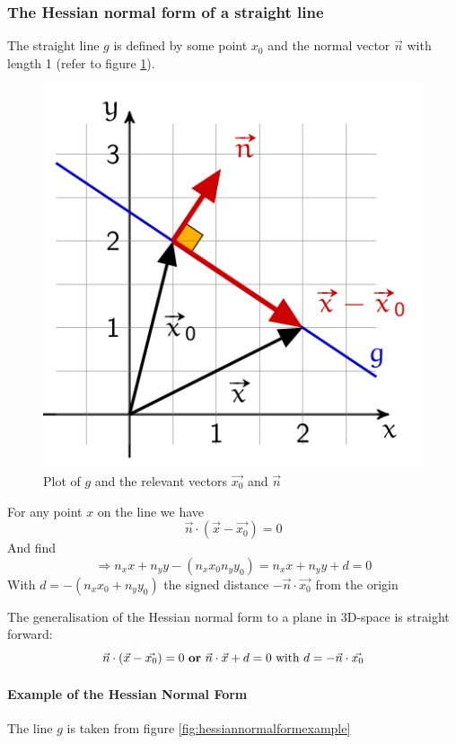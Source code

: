\documentclass[a4paper, 11pt]{article}
\begin{document}
\subsubsection{The Hessian normal form of a straight line}

The straight line $g$ is defined by some point $x_0$ and the normal vector $\vec{n}$ with length 1 (refer to figure \ref{fig:hessiannormalform}).

\begin{figure}[htb!]
	\centering
	\includegraphics[keepaspectratio, width=0.4\linewidth]{Pictures/Hessian_normal_form}
	\caption{Plot of $g$ and the relevant vectors $\vec{x_0}$ and $\vec{n}$}
	\label{fig:hessiannormalform}
\end{figure}
\noindent
For any point $x$ on the line we have
\begin{equation*}
\vec{n}\cdot(\vec{x}-\vec{x_0})=0
\end{equation*}
\noindent
And find
\begin{equation*}
\Rightarrow n_x x + n_y y -(n_x x_0  n_y y_0) = n_x x +n_y y + d = 0
\end{equation*}
\noindent
With $d=-(n_x x_0 +n_y y_0)$ the signed distance $-\vec{n}\cdot\vec{x_0}$ from the origin

The generalisation of the Hessian normal form to a plane in 3D-space is straight forward:
\begin{equation}
\vec{n}\cdot(\vec{x} - \vec{x_0}) = 0 \text{ \textbf{or} } \vec{n}\cdot\vec{x} + d = 0\text{ with } d = -\vec{n}\cdot\vec{x_0}
\end{equation}

\paragraph{Example of the Hessian Normal Form}
The line $g$ is taken from figure \ref{fig:hessiannormalformexample}
\end{document}
